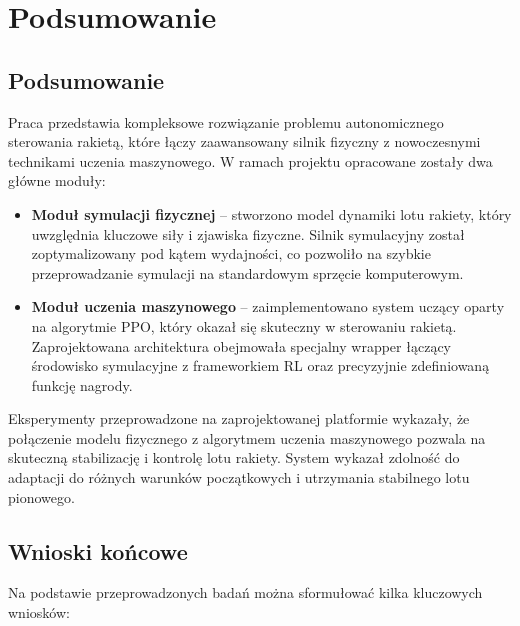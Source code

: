 \chapter{Podsumowanie}

\section{Podsumowanie}
Praca przedstawia kompleksowe rozwiązanie problemu autonomicznego sterowania rakietą, które łączy zaawansowany silnik fizyczny z nowoczesnymi technikami uczenia maszynowego. W ramach projektu opracowane zostały dwa główne moduły:

\begin{itemize}
    \item \textbf{Moduł symulacji fizycznej} – stworzono model dynamiki lotu rakiety, który uwzględnia kluczowe siły i zjawiska fizyczne. Silnik symulacyjny został zoptymalizowany pod kątem wydajności, co pozwoliło na szybkie przeprowadzanie symulacji na standardowym sprzęcie komputerowym.

    \item \textbf{Moduł uczenia maszynowego} – zaimplementowano system uczący oparty na algorytmie PPO, który okazał się skuteczny w sterowaniu rakietą. Zaprojektowana architektura obejmowała specjalny wrapper łączący środowisko symulacyjne z frameworkiem RL oraz precyzyjnie zdefiniowaną funkcję nagrody.
\end{itemize}

Eksperymenty przeprowadzone na zaprojektowanej platformie wykazały, że połączenie modelu fizycznego z algorytmem uczenia maszynowego pozwala na skuteczną stabilizację i kontrolę lotu rakiety. System wykazał zdolność do adaptacji do różnych warunków początkowych i utrzymania stabilnego lotu pionowego.

\section{Wnioski końcowe}
Na podstawie przeprowadzonych badań można sformułować kilka kluczowych wniosków:

